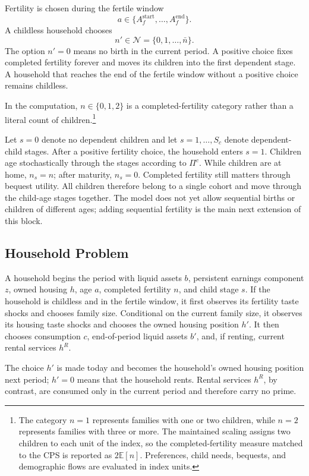 \documentclass[11pt]{article}
\theoremstyle{definition}
\newcommand{\E}{\mathbb E}
\newcommand{\1}{\mathbf 1}
\newcommand{\Nset}{\mathcal N}
\begin{document}
Fertility is chosen during the fertile window
\[
a\in\{A_f^{\mathrm{start}},\ldots,A_f^{\mathrm{end}}\}.
\]
A childless household chooses
\begin{equation}
n'\in\Nset=\{0,1,\ldots,\bar n\}.
\label{eq:quant_fertility_set}
\end{equation}
The option $n'=0$ means no birth in the current period. A positive choice fixes
completed fertility forever and moves its children into the first dependent
stage. A household that reaches the end of the fertile window
without a positive choice remains childless.

In the computation, $n\in\{0,1,2\}$ is a completed-fertility category rather than a
literal count of children.\footnote{The category $n=1$ represents families
with one or two children, while $n=2$ represents families with three or more.
The maintained scaling assigns two children to each unit of the index, so the
completed-fertility measure matched to the CPS is reported as $2\E[n]$.
Preferences, child needs, bequests, and demographic flows are evaluated in
index units.}

Let $s=0$ denote no dependent children and let $s=1,\ldots,S_c$ denote
dependent-child stages. After a positive fertility choice, the household enters
$s=1$. Children age stochastically through the stages according to $\Pi^c$.
While children are at home, $n_s=n$; after maturity, $n_s=0$. Completed
fertility still matters through bequest utility. All children therefore belong
to a single cohort and move through the child-age stages together. The model
does not yet allow sequential births or children of different ages; adding
sequential fertility is the main next extension of this block.

\subsection{Household Problem}

A household begins the period with liquid assets $b$, persistent earnings
component $z$, owned
housing $h$, age $a$, completed fertility $n$, and child stage $s$. If the
household is childless and in the fertile window, it first observes its
fertility taste shocks and chooses family size. Conditional on the current
family size, it observes its housing taste shocks and chooses the owned housing
position $h'$. It then chooses consumption $c$, end-of-period liquid assets
$b'$, and, if renting, current rental services $h^R$.

The choice $h'$ is made today and becomes the household's owned housing
position next period; $h'=0$ means that the household rents. Rental services
$h^R$, by contrast, are consumed only in the current period and therefore carry
no prime.
\end{document}

